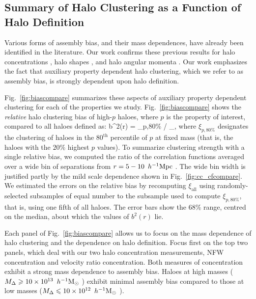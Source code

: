 \documentclass[usenatbib,fleqn]{mnras}
\begin{document}
\subsection{Summary of Halo Clustering as a Function of Halo Definition}

Various forms of assembly bias, and their mass dependences, have already been identified in the literature. Our work confirms these previous results for halo concentrations \citep{wechsler_etal06,faltenbacher_white10,mao_etal15, sunayama_etal16}, halo shapes \citep{bett_etal07,hahn_etal07b,hahn_etal07b,faltenbacher_white10,lacerna_padilla12,vandaalen_etal12}, and halo angular momenta  \citep{bett_etal07,hahn_etal07a,hahn_etal07b,lacerna_padilla12}. Our work emphasizes the fact that auxiliary property dependent halo clustering, which we refer to as assembly bias, is strongly dependent upon halo definition. 

Fig.~\ref{fig:biascompare} summarizes these aspects of auxiliary property dependent clustering for each of the properties we study. Fig.~\ref{fig:biascompare} shows the {\em relative} halo clustering bias of high-$p$ haloes, where $p$ is the property of interest, compared to all haloes defined as: 
\beq
b^2(r) = \xi_{p,80\%} / \xi_{},
\eeq
%
where $\xi_{p,80\%}$ designates the clustering of haloes in the $80^{\mathrm{th}}$ percentile of $p$ at fixed mass (that is, the haloes with the $20\%$ highest $p$ values). To summarize clustering strength with a single relative bias, we computed the ratio of the correlation functions averaged over a wide bin of separations from $r = 5-10\, \ h^{-1}\mathrm{Mpc}~$. The wide bin width is justified partly by the mild scale dependence shown in Fig.~\ref{fig:cc_cfcompare}. We estimated the errors on the relative bias by recomputing $\xi_{\mathrm{all}}$ using randomly-selected subsamples of equal number to the subsample used to compute $\xi_{p,80\%}$, that is, using one fifth of all haloes. The error bars show the $68\%$ range, centred on the median, about which the values of $b^2(r)$ lie. 

Each panel of Fig.~\ref{fig:biascompare} allows us to focus on the mass dependence of halo clustering and the dependence on halo definition. Focus first on the top two panels, which deal with our two halo concentration measurements, NFW concentration and velocity ratio concentration. Both measures of concentration exhibit a strong mass dependence to assembly bias. Haloes at high masses ($M_{\Delta} \geqslant 10\times10^{13}\, \ h^{-1}\mathrm{M}_{\odot}~$) exhibit minimal assembly bias compared to those at low masses ($M_{\Delta} \leqslant 10\times10^{12}\, \ h^{-1}\mathrm{M}_{\odot}~$). 
\end{document}
